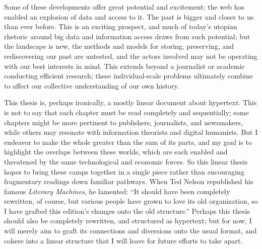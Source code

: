 Some of these developments offer great potential and excitement; the web has enabled an explosion of data and access to it. The past is bigger and closer to us than ever before. This is an exciting prospect, and much of today's utopian rhetoric around big data and information access draws from such potential; but the landscape is new, the methods and models for storing, preserving, and rediscovering our past are untested, and the actors involved may not be operating with our best interests in mind. This extends beyond a journalist or academic conducting efficient research; these individual-scale problems ultimately combine to affect our collective understanding of our own history.

This thesis is, perhaps ironically, a mostly linear document about hypertext. This is not to say that each chapter must be read completely and sequentially; some chapters might be more pertinent to publishers, journalists, and newsmakers, while others may resonate with information theorists and digital humanists. But I endeavor to make the whole greater than the sum of its parts, and my goal is to highlight the overlaps between these worlds, which are each enabled and threatened by the same technological and economic forces. So this linear thesis hopes to bring these camps together in a single piece rather than encouraging fragmentary readings down familiar pathways. When Ted Nelson republished his famous \emph{Literary Machines}, he lamented: ``It should have been completely rewritten, of course, but various people have grown to love its old organization, so I have grafted this edition's changes onto the old structure.''\autocite[1.1 (CHECK THIS)]{nelson_literary_1987} Perhaps this thesis should also be completely rewritten, and structured as hypertext; but for now, I will merely aim to graft its connections and diversions onto the usual format, and cohere into a linear structure that I will leave for future efforts to take apart.



